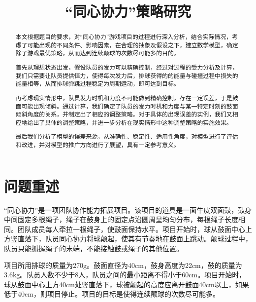 \documentclass[withoutpreface,bwprint]{cumcmthesis} %
\title{“同心协力”策略研究}
\begin{document}
 \maketitle
 \begin{abstract}
本文根据题目的要求，对“同心协力”游戏项目的过程进行深入分析，结合实际情况，考虑了可能出现的不同条件、影响因素，在合理的抽象及假设之下，建立数学模型，确定除了游戏最优策略，从而达到连续颠球的次数尽可能多的目的。

首先从理想状态出发，假设队员的发力可以精确控制，经过对过程的受力分析及计算，我们只需要让队员提供恒力，使得每次发力后，排球获得的的能量与碰撞过程中损失的能量相等，从而排球弹跳过程稳定为周期运动，即可达到目标。

再考虑现实情形中，队员发力时机和力度不可能做到精确控制，存在一定误差，于是鼓面可能出现倾斜。通过计算，我们确定了队员的发力时机和力度与某一特定时刻的鼓面倾斜角度的关系，并制定出了相应的调整策略。对于具体的出现误差的实例，我们又相应地给出了具体的调整策略，并进一步分析在现实情形中这种调整策略的实施效果。

最后我们分析了模型的误差来源，从准确性、稳定性、适用性角度，对模型进行了评估和改进，并对模型的推广方向进行了展望，具有一定参考意义。

\end{abstract}



\renewcommand\thesection{\arabic{section}}
\section{问题重述}
“同心协力”是一项团队协作能力拓展项目。该项目的道具是一面牛皮双面鼓，鼓身中间固定多根绳子，绳子在鼓身上的固定点沿圆周呈均匀分布，每根绳子长度相同。团队成员每人牵拉一根绳子，使鼓面保持水平。项目开始时，球从鼓面中心上方竖直落下，队员同心协力将球颠起，使其有节奏地在鼓面上跳动。颠球过程中，队员只能抓握绳子的末端，不能接触鼓或绳子的其他位置。

项目所用排球的质量为270g。鼓面直径为40cm，鼓身高度为22cm，鼓的质量为3.6kg。队员人数不少于8人，队员之间的最小距离不得小于60cm。项目开始时，球从鼓面中心上方40cm处竖直落下，球被颠起的高度应离开鼓面40cm以上，如果低于40cm，则项目停止。项目的目标是使得连续颠球的次数尽可能多。
\end{document}
